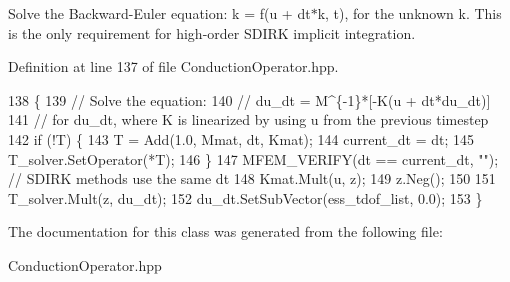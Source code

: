 Solve the Backward-\/\+Euler equation\+: k = f(u + dt$\ast$k, t), for the unknown k. This is the only requirement for high-\/order S\+D\+I\+RK implicit integration. 

Definition at line 137 of file Conduction\+Operator.\+hpp.


\begin{DoxyCode}
138                                                           \{
139   \textcolor{comment}{// Solve the equation:}
140   \textcolor{comment}{//    du\_dt = M^\{-1\}*[-K(u + dt*du\_dt)]}
141   \textcolor{comment}{// for du\_dt, where K is linearized by using u from the previous timestep}
142   \textcolor{keywordflow}{if} (!T) \{
143     T = Add(1.0, Mmat, dt, Kmat);
144     current\_dt = dt;
145     T\_solver.SetOperator(*T);
146   \}
147   MFEM\_VERIFY(dt == current\_dt, \textcolor{stringliteral}{""});  \textcolor{comment}{// SDIRK methods use the same dt}
148   Kmat.Mult(u, z);
149   z.Neg();
150 
151   T\_solver.Mult(z, du\_dt);
152   du\_dt.SetSubVector(ess\_tdof\_list, 0.0);
153 \}
\end{DoxyCode}


The documentation for this class was generated from the following file\+:\begin{DoxyCompactItemize}
\item 
Conduction\+Operator.\+hpp\end{DoxyCompactItemize}
